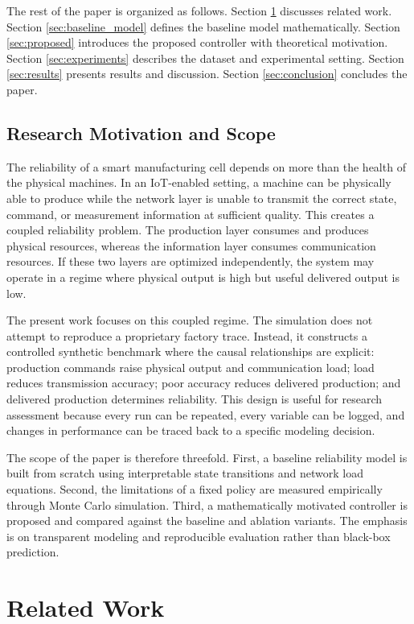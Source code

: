\documentclass[journal]{IEEEtran}
\begin{document}
The rest of the paper is organized as follows. Section \ref{sec:related} discusses related work. Section \ref{sec:baseline_model} defines the baseline model mathematically. Section \ref{sec:proposed} introduces the proposed controller with theoretical motivation. Section \ref{sec:experiments} describes the dataset and experimental setting. Section \ref{sec:results} presents results and discussion. Section \ref{sec:conclusion} concludes the paper.

\subsection{Research Motivation and Scope}

The reliability of a smart manufacturing cell depends on more than the health of the physical machines. In an IoT-enabled setting, a machine can be physically able to produce while the network layer is unable to transmit the correct state, command, or measurement information at sufficient quality. This creates a coupled reliability problem. The production layer consumes and produces physical resources, whereas the information layer consumes communication resources. If these two layers are optimized independently, the system may operate in a regime where physical output is high but useful delivered output is low.

The present work focuses on this coupled regime. The simulation does not attempt to reproduce a proprietary factory trace. Instead, it constructs a controlled synthetic benchmark where the causal relationships are explicit: production commands raise physical output and communication load; load reduces transmission accuracy; poor accuracy reduces delivered production; and delivered production determines reliability. This design is useful for research assessment because every run can be repeated, every variable can be logged, and changes in performance can be traced back to a specific modeling decision.

The scope of the paper is therefore threefold. First, a baseline reliability model is built from scratch using interpretable state transitions and network load equations. Second, the limitations of a fixed policy are measured empirically through Monte Carlo simulation. Third, a mathematically motivated controller is proposed and compared against the baseline and ablation variants. The emphasis is on transparent modeling and reproducible evaluation rather than black-box prediction.

\section{Related Work}
\label{sec:related}
\end{document}
